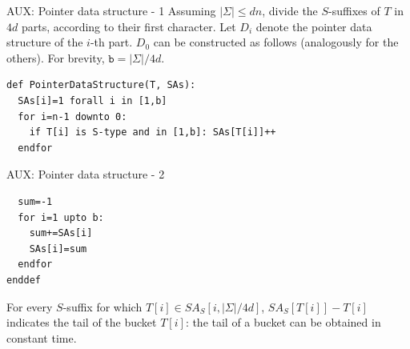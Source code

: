 \documentclass{beamer}
\begin{document}
  \begin{frame}[fragile]{AUX: Pointer data structure - 1}\label{AUX5.pointer}
    Assuming $|\Sigma| \le dn$, divide the $S$-suffixes of $T$ in $4d$ parts, according to their first character. Let $D_i$ denote the pointer data structure of the $i$-th part. $D_0$ can be constructed as follows (analogously for the others). For brevity, $\texttt{b} = |\Sigma|/4d$.

    \begin{lstlisting}
def PointerDataStructure(T, SAs):
  SAs[i]=1 forall i in [1,b]
  for i=n-1 downto 0:
    if T[i] is S-type and in [1,b]: SAs[T[i]]++
  endfor
    \end{lstlisting}

  \end{frame}

  \begin{frame}[fragile]{AUX: Pointer data structure - 2}
    \begin{lstlisting}
  sum=-1
  for i=1 upto b:
    sum+=SAs[i]
    SAs[i]=sum
  endfor
enddef
    \end{lstlisting}

    For every $S$-suffix for which $T[i]\in SA_S[i,|\Sigma|/4d]$, $SA_S[T[i]] - T[i]$ indicates the tail of the bucket $T[i]$: the tail of a bucket can be obtained in constant time. \hyperlink{5}{\beamerbutton{$\hookleftarrow$}}

  \end{frame}
\end{document}
